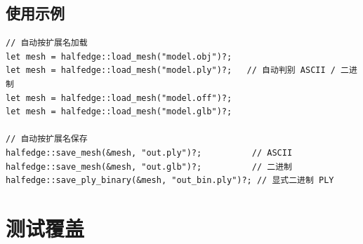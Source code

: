 \documentclass[11pt,a4paper]{article}
\begin{document}
\subsection{使用示例}

\begin{lstlisting}
// 自动按扩展名加载
let mesh = halfedge::load_mesh("model.obj")?;
let mesh = halfedge::load_mesh("model.ply")?;   // 自动判别 ASCII / 二进制
let mesh = halfedge::load_mesh("model.off")?;
let mesh = halfedge::load_mesh("model.glb")?;

// 自动按扩展名保存
halfedge::save_mesh(&mesh, "out.ply")?;          // ASCII
halfedge::save_mesh(&mesh, "out.glb")?;          // 二进制
halfedge::save_ply_binary(&mesh, "out_bin.ply")?; // 显式二进制 PLY
\end{lstlisting}

\section{测试覆盖}
\end{document}

